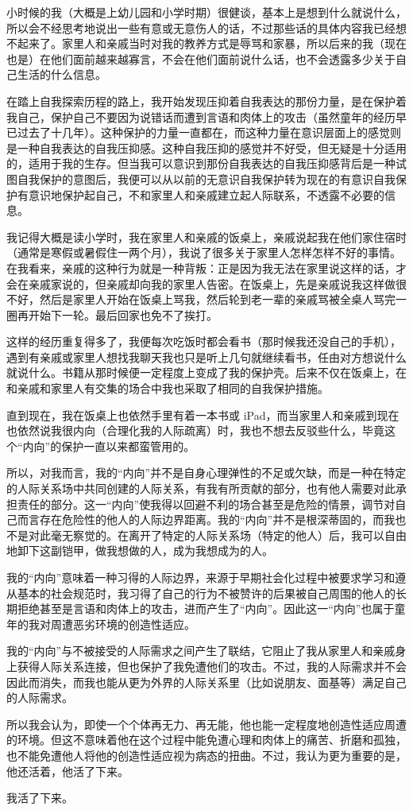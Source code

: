 小时候的我（大概是上幼儿园和小学时期）很健谈，基本上是想到什么就说什么，所以会不经思考地说出一些有意或无意伤人的话，不过那些话的具体内容我已经想不起来了。家里人和亲戚当时对我的教养方式是辱骂和家暴，所以后来的我（现在也是）在他们面前越来越寡言，不会在他们面前说什么话，也不会透露多少关于自己生活的什么信息。

在踏上自我探索历程的路上，我开始发现压抑着自我表达的那份力量，是在保护着我自己，保护自己不要因为说错话而遭到言语和肉体上的攻击（虽然童年的经历早已过去了十几年）。这种保护的力量一直都在，而这种力量在意识层面上的感觉则是一种自我表达的自我压抑感。这种自我压抑的感觉并不好受，但无疑是十分适用的，适用于我的生存。但当我可以意识到那份自我表达的自我压抑感背后是一种试图自我保护的意图后，我便可以从以前的无意识自我保护转为现在的有意识自我保护\pozhehao{}有意识地保护起自己，不和家里人和亲戚建立起人际联系，不透露不必要的信息。

\tristarsepline

我记得大概是读小学时，我在家里人和亲戚的饭桌上，亲戚说起我在他们家住宿时（通常是寒假或暑假住一两个月），我说了很多关于家里人怎样怎样不好的事情。在我看来，亲戚的这种行为就是一种背叛：正是因为我无法在家里说这样的话，才会在亲戚家说的，但亲戚却向我的家里人告密。在饭桌上，先是亲戚说我这样做很不好，然后是家里人开始在饭桌上骂我，然后轮到老一辈的亲戚骂\pozhehao{}被全桌人骂完一圈再开始下一轮。最后回家也免不了挨打。

这样的经历重复得多了，我便每次吃饭时都会看书（那时候我还没自己的手机），遇到有亲戚或家里人想找我聊天我也只是听上几句就继续看书，任由对方想说什么就说什么。书籍从那时候便一定程度上变成了我的保护壳。后来不仅在饭桌上，在和亲戚和家里人有交集的场合中我也采取了相同的自我保护措施。

直到现在，我在饭桌上也依然手里有着一本书或 iPad，而当家里人和亲戚到现在也依然说我很内向（合理化我的人际疏离）时，我也不想去反驳些什么，毕竟这个“内向”的保护一直以来都蛮管用的。

\tristarsepline

所以，对我而言，我的“内向”并不是自身心理弹性的不足或欠缺，而是一种在特定的人际关系场中共同创建的人际关系，有我有所贡献的部分，也有他人需要对此承担责任的部分。这一“内向”使我得以回避不利的场合甚至是危险的情景，调节对自己而言存在危险性的他人的人际边界距离。我的“内向”并不是根深蒂固的，而我也不是对此毫无察觉的。在离开了特定的人际关系场（特定的他人）后，我可以自由地卸下这副铠甲，做我想做的人，成为我想成为的人。

我的“内向”意味着一种习得的人际边界，来源于早期社会化过程中被要求学习和遵从基本的社会规范时，我习得了自己的行为不被赞许的后果\pozhehao{}被自己周围的他人的长期拒绝甚至是言语和肉体上的攻击，进而产生了“内向”。因此这一“内向”也属于童年的我对周遭恶劣环境的创造性适应。

我的“内向”与不被接受的人际需求之间产生了联结，它阻止了我从家里人和亲戚身上获得人际关系连接，但也保护了我免遭他们的攻击。不过，我的人际需求并不会因此而消失，而我也能从更为外界的人际关系里（比如说朋友、面基等）满足自己的人际需求。

\tristarsepline

所以我会认为，即使一个个体再无力、再无能，他也能一定程度地创造性适应周遭的环境。但这不意味着他在这个过程中能免遭心理和肉体上的痛苦、折磨和孤独，也不能免遭他人将他的创造性适应视为病态的扭曲。不过，我认为更为重要的是，他还活着，他活了下来。

我活了下来。

